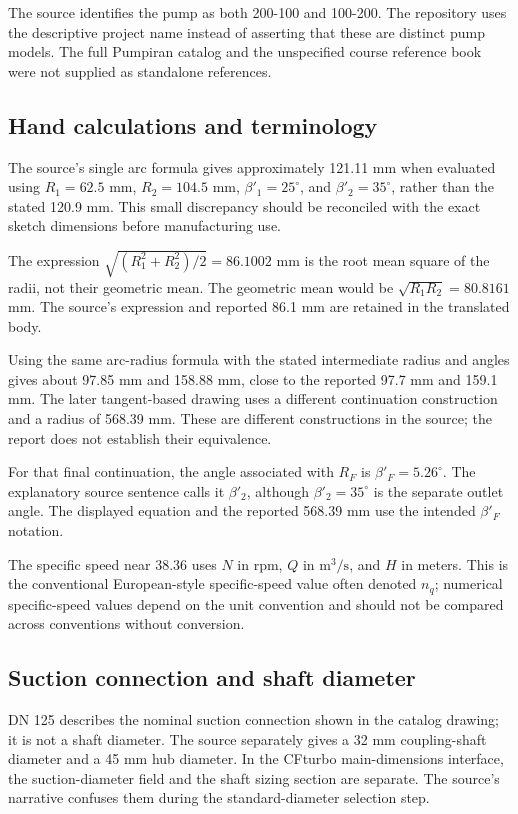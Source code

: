 \documentclass[11pt,a4paper]{article}
\begin{document}
The source identifies the pump as both 200-100 and 100-200. The repository uses the descriptive project name instead of asserting that these are distinct pump models. The full Pumpiran catalog and the unspecified course reference book were not supplied as standalone references.

\subsection{Hand calculations and terminology}
The source's single arc formula gives approximately 121.11 mm when evaluated using $R_1=62.5$ mm, $R_2=104.5$ mm, $\beta'_1=25^\circ$, and $\beta'_2=35^\circ$, rather than the stated 120.9 mm. This small discrepancy should be reconciled with the exact sketch dimensions before manufacturing use.

The expression $\sqrt{(R_1^2+R_2^2)/2}=86.1002$ mm is the root mean square of the radii, not their geometric mean. The geometric mean would be $\sqrt{R_1R_2}=80.8161$ mm. The source's expression and reported 86.1 mm are retained in the translated body.

Using the same arc-radius formula with the stated intermediate radius and angles gives about 97.85 mm and 158.88 mm, close to the reported 97.7 mm and 159.1 mm. The later tangent-based drawing uses a different continuation construction and a radius of 568.39 mm. These are different constructions in the source; the report does not establish their equivalence.

For that final continuation, the angle associated with $R_F$ is $\beta'_F=5.26^\circ$. The explanatory source sentence calls it $\beta'_2$, although $\beta'_2=35^\circ$ is the separate outlet angle. The displayed equation and the reported 568.39 mm use the intended $\beta'_F$ notation.

The specific speed near 38.36 uses $N$ in rpm, $Q$ in $\mathrm{m^3/s}$, and $H$ in meters. This is the conventional European-style specific-speed value often denoted $n_q$; numerical specific-speed values depend on the unit convention and should not be compared across conventions without conversion.

\subsection{Suction connection and shaft diameter}
DN 125 describes the nominal suction connection shown in the catalog drawing; it is not a shaft diameter. The source separately gives a 32 mm coupling-shaft diameter and a 45 mm hub diameter. In the CFturbo main-dimensions interface, the suction-diameter field and the shaft sizing section are separate. The source's narrative confuses them during the standard-diameter selection step.
\end{document}
